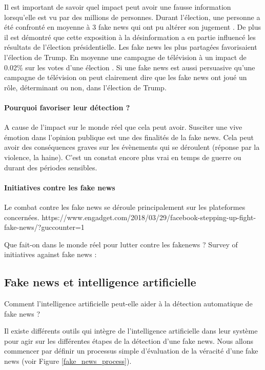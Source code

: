 Il est important de savoir quel impact peut avoir une fausse information lorsqu'elle est vu par des millions de personnes. Durant l'élection, une personne a été confronté en moyenne à 3 fake news qui ont pu altérer son jugement \cite{allcott2017social}. De plus il est démontré que cette exposition à la désinformation a en partie influencé les résultats de l'élection présidentielle. Les fake news les plus partagées favorisaient l'élection de Trump. En moyenne une campagne de télévision à un impact de 0.02\% sur les votes d'une élection \cite{spenkuch2016political}. Si une fake news est aussi persuasive qu'une campagne de télévision on peut clairement dire que les fake news ont joué un rôle, déterminant ou non, dans l'élection de Trump.

\paragraph{Pourquoi favoriser leur détection ?} A cause de l'impact sur le monde réel que cela peut avoir. Susciter une vive émotion dans l'opinion publique est une des finalités de la fake news. Cela peut avoir des conséquences graves sur les évènements qui se déroulent (réponse par la violence, la haine). C'est un constat encore plus vrai en temps de guerre ou durant des périodes sensibles.

\paragraph{Initiatives contre les fake news}

Le combat contre les fake news se déroule principalement sur les plateformes concernées.  https://www.engadget.com/2018/03/29/facebook-stepping-up-fight-fake-news/?guccounter=1

Que fait-on dans le monde réel pour lutter contre les fakenews ?
Survey of initiatives against fake news : \cite{haciyakupoglu2018countering}


\subsection{Fake news et intelligence artificielle}

Comment l'intelligence artificielle peut-elle aider à la détection automatique de fake news ? 

Il existe différents outils qui intègre de l'intelligence artificielle dans leur système pour agir sur les différentes étapes de la détection d'une fake news. Nous allons commencer par définir un processus simple d'évaluation de la véracité d'une fake news (voir Figure \ref{fake_news_process}).

